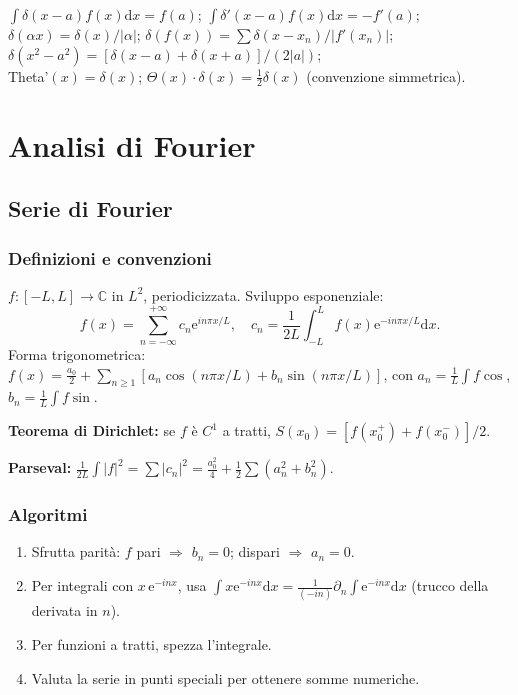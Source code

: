 \documentclass[11pt,a4paper,openany]{book}
\theoremstyle{definition}
\newcommand{\C}{\mathbb{C}}
\newcommand{\dd}{\mathrm{d}}
\newcommand{\eu}{\mathrm{e}}
\begin{document}
\begin{formulario}
$\int\delta(x-a)f(x)\dd x=f(a)$; $\int\delta'(x-a)f(x)\dd x=-f'(a)$;
\\$\delta(\alpha x)=\delta(x)/|\alpha|$; $\delta(f(x))=\sum\delta(x-x_n)/|f'(x_n)|$;
\\$\delta(x^2-a^2)=[\delta(x-a)+\delta(x+a)]/(2|a|)$;
\\Theta'$(x)=\delta(x)$; $\Theta(x)\cdot\delta(x)=\frac{1}{2}\delta(x)$ (convenzione simmetrica).
\end{formulario}

\part{Analisi di Fourier}

\chapter{Serie di Fourier}\label{ch:serie-fourier}

\section{Definizioni e convenzioni}
\begin{teoria}
$f:[-L,L]\to\C$ in $L^2$, periodicizzata. Sviluppo esponenziale:
$$f(x)=\sum_{n=-\infty}^{+\infty}c_n\eu^{in\pi x/L},\quad c_n=\frac{1}{2L}\int_{-L}^L f(x)\eu^{-in\pi x/L}\dd x.$$
Forma trigonometrica: $f(x)=\frac{a_0}{2}+\sum_{n\ge 1}[a_n\cos(n\pi x/L)+b_n\sin(n\pi x/L)]$, con $a_n=\frac{1}{L}\int f\cos$, $b_n=\frac{1}{L}\int f\sin$.

\textbf{Teorema di Dirichlet:} se $f$ \`e $C^1$ a tratti, $S(x_0)=[f(x_0^+)+f(x_0^-)]/2$.

\textbf{Parseval:} $\frac{1}{2L}\int|f|^2=\sum|c_n|^2=\frac{a_0^2}{4}+\frac{1}{2}\sum(a_n^2+b_n^2)$.
\end{teoria}

\section{Algoritmi}

\begin{algoritmo}
\begin{enumerate}
\item Sfrutta parit\`a: $f$ pari $\Rightarrow$ $b_n=0$; dispari $\Rightarrow$ $a_n=0$.
\item Per integrali con $x\,\eu^{-inx}$, usa $\int x\eu^{-inx}\dd x=\frac{1}{(-in)}\partial_n\int\eu^{-inx}\dd x$ (trucco della derivata in $n$).
\item Per funzioni a tratti, spezza l'integrale.
\item Valuta la serie in punti speciali per ottenere somme numeriche.
\end{enumerate}
\end{algoritmo}
\end{document}
